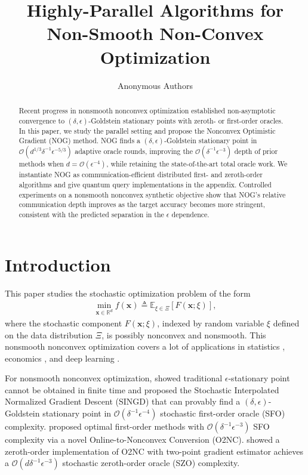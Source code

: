 \documentclass{article}
\title{Highly-Parallel Algorithms for Non-Smooth Non-Convex Optimization}
\author{Anonymous Authors}
\def\vx{{\bm{x}}}
\def\gO{{\mathcal{O}}}
\def\sR{{\mathbb{R}}}
\theoremstyle{definition}
\theoremstyle{remark}
\begin{document}
	
	\maketitle
	
	
	\begin{abstract}
		Recent progress in nonsmooth nonconvex optimization established non-asymptotic convergence to $(\delta,\epsilon)$-Goldstein stationary points with zeroth- or first-order oracles. In this paper, we study the parallel setting and propose the Nonconvex Optimistic Gradient (NOG) method. NOG finds a $(\delta,\epsilon)$-Goldstein stationary point in $\gO(d^{1/3}\delta^{-1}\epsilon^{-5/3})$ adaptive oracle rounds, improving the $\gO(\delta^{-1}\epsilon^{-3})$ depth of prior methods when $d=\gO(\epsilon^{-4})$, while retaining the state-of-the-art total oracle work. We instantiate NOG as communication-efficient distributed first- and zeroth-order algorithms and give quantum query implementations in the appendix. Controlled experiments on a nonsmooth nonconvex synthetic objective show that NOG's relative communication depth improves as the target accuracy becomes more stringent, consistent with the predicted separation in the $\epsilon$ dependence.
	\end{abstract}
	
	\section{Introduction}
	
	This paper studies the stochastic optimization problem of the form
	\begin{align} \label{prob:main}
		\min_{\vx \in \sR^d} f(\vx) \triangleq \mathbb{E}_{\xi \in \Xi} [F(\vx; \xi)],
	\end{align}
	where the stochastic component $F(\vx;\xi)$, indexed by random variable $\xi$ defined on the data distribution $\Xi$, is possibly nonconvex and nonsmooth. This nonsmooth nonconvex optimization covers a lot of applications in statistics \citep{fan2001variable,zhang2010analysis}, economics \citep{duffie2010dynamic,stadtler2014supply}, and deep learning \citep{lecun2015deep,davis2020stochastic,bolte2021conservative,zhang2020complexity}. 
	
	
	For nonsmooth nonconvex optimization,
	\citet{zhang2020complexity} showed traditional $\epsilon$-stationary point cannot be obtained in finite time and proposed the Stochastic Interpolated Normalized Gradient Descent (SINGD) that can provably find a $(\delta,\epsilon)$-Goldstein stationary point \citep{goldstein1977optimization} in $\gO(\delta^{-1} \epsilon^{-4})$ stochastic first-order oracle (SFO) complexity. 
	\citet{cutkosky2023optimal} proposed optimal first-order  methods with $\gO(\delta^{-1} \epsilon^{-3})$ SFO complexity via a novel Online-to-Nonconvex Conversion (O2NC). \citet{kornowski2024algorithm} showed a zeroth-order implementation of O2NC with two-point gradient estimator \citep{shamir2017optimal,duchi2015optimal} achieves a  $\gO(d \delta^{-1} \epsilon^{-3})$ stochastic zeroth-order oracle (SZO) complexity.
	
\end{document}
